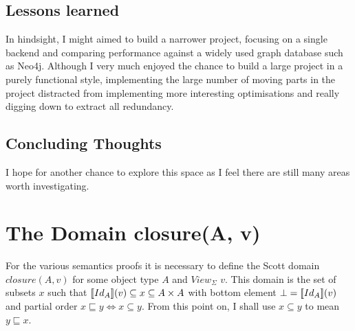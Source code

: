 \documentclass[12pt,a4paper,twoside,openright]{report}
\newcommand{\db}[1]{{\bf [\![}#1{\bf ]\!]}}
\newcommand{\deno}[1]{\db{#1}(v)}
\newcommand{\clos}[0]{closure(A, v)}
\begin{document}
\section{Lessons learned}
	In hindsight, I might aimed to build a narrower project, focusing on a single backend and comparing  performance against a widely used graph database such as Neo4j. Although I very much enjoyed the chance to build a large project in a purely functional style, implementing the large number of moving parts in the project distracted from implementing more interesting optimisations and really digging down to extract all redundancy.

\section{Concluding Thoughts}
I hope for another chance to explore this space as I feel there are still many areas worth investigating.






\appendix
{}
\chapter{The Domain \clos}

For the various semantics proofs it is necessary to define the Scott domain $\clos$ for some object type $A$ and $View_{\Sigma}$ $v$. This domain is the set of subsets $x$ such that $\deno{Id_A} \subseteq x \subseteq A \times A$ with bottom element $\bot = \deno{Id_A}$ and partial order $x \sqsubseteq y \Leftrightarrow x \subseteq y$. From this point on, I shall use $x \subseteq y$ to mean $y \sqsubseteq x$.
\end{document}
